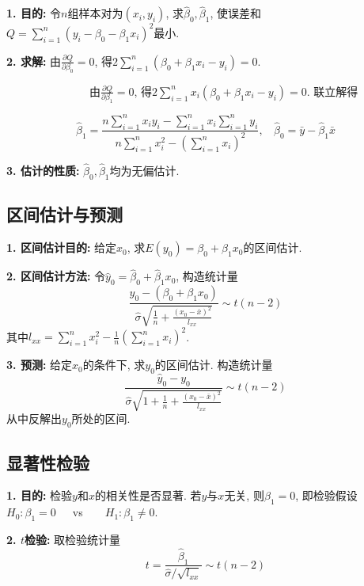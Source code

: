 \textbf{1. 目的: }令$n$组样本对为$(x_i,y_i)$, 求$\hat{\beta}_0,\hat{\beta}_1$, 使误差和$Q=\sum\limits_{i=1}^n (y_i-\beta_0-\beta_1 x_i)^2$最小.

\textbf{2. 求解: }由$\frac{\partial Q}{\partial \beta_0}=0$, 得$2\sum\limits_{i=1}^n (\beta_0+\beta_1x_i-y_i)=0$.

~~~~~~~~~~~~~~~由$\frac{\partial Q}{\partial \beta_1}=0$, 得$2\sum\limits_{i=1}^n x_i(\beta_0+\beta_1x_i-y_i)=0$. 联立解得

\begin{equation*}
    \hat{\beta}_1=\frac{n\sum\limits_{i=1}^n x_iy_i-\sum\limits_{i=1}^n x_i \sum\limits_{i=1}^n y_i}{n\sum\limits_{i=1}^n x_i^2 -(\sum\limits_{i=1}^n x_i)^2} , ~~~~\hat{\beta}_0=\bar{y}-\hat{\beta}_1\bar{x}
\end{equation*}

\textbf{3. 估计的性质: }$\hat{\beta}_0,\hat{\beta}_1$均为无偏估计.

\subsection{区间估计与预测}

\textbf{1. 区间估计目的: }给定$x_0$, 求$E(y_0)=\beta_0+\beta_1x_0$的区间估计.

\textbf{2. 区间估计方法: }令$\hat{y}_0=\hat{\beta}_0+\hat{\beta}_1 x_0$, 构造统计量
\begin{equation*}
    \frac{\hat{y}_0-(\beta_0+\beta_1 x_0)}{\hat{\sigma}\sqrt{\frac{1}{n}+\frac{(x_0-\bar{x})^2}{l_{xx}}}} \sim t(n-2)
\end{equation*}
其中$l_{xx}=\sum\limits_{i=1}^n x_i^2-\frac{1}{n}(\sum\limits_{i=1}^n x_i)^2$.

\textbf{3. 预测: }给定$x_0$的条件下, 求$y_0$的区间估计. 构造统计量
\begin{equation*}
    \frac{\hat{y}_0-y_0}{\hat{\sigma}\sqrt{1+\frac{1}{n}+\frac{(x_0-\bar{x})^2}{l_{xx}}}} \sim t(n-2)
\end{equation*}
从中反解出$y_0$所处的区间.

\subsection{显著性检验}

\textbf{1. 目的: }检验$y$和$x$的相关性是否显著. 若$y$与$x$无关, 则$\beta_1=0$, 即检验假设$H_0:\beta_1=0$~~~vs~~~~$H_1:\beta_1 \neq 0$.

\textbf{2. $t$检验: }取检验统计量
\begin{equation*}
    t=\frac{\hat{\beta}_1}{\hat{\sigma}/\sqrt{l_{xx}}} \sim t(n-2)
\end{equation*}

